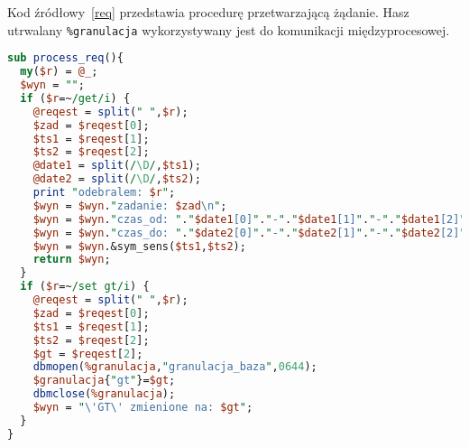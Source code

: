 {\color{dgray}
Kod źródłowy~\ref{req} przedstawia procedurę przetwarzającą żądanie. Hasz utrwalany \verb|%granulacja| wykorzystywany jest do komunikacji międzyprocesowej.
}

\begin{small}
\begin{lstlisting}[language=perl, frame=lines, caption=Przetwarzanie żądania - procedura \texttt{process\_req()}\label{req}., firstnumber=86]
sub process_req(){	
  my($r) = @_;
  $wyn = "";
  if ($r=~/get/i) {
	@reqest = split(" ",$r);
	$zad = $reqest[0];
	$ts1 = $reqest[1];
	$ts2 = $reqest[2];
	@date1 = split(/\D/,$ts1);
	@date2 = split(/\D/,$ts2);
	print "odebralem: $r"; 
	$wyn = $wyn."zadanie: $zad\n";
	$wyn = $wyn."czas_od: "."$date1[0]"."-"."$date1[1]"."-"."$date1[2]"."_"."$date1[3]".":"."$date1[4]".":"."$date1[5]"."\n";
	$wyn = $wyn."czas_do: "."$date2[0]"."-"."$date2[1]"."-"."$date2[2]"."_"."$date2[3]".":"."$date2[4]".":"."$date2[5]"."\n";		
	$wyn = $wyn.&sym_sens($ts1,$ts2);
	return $wyn;
  }
  if ($r=~/set gt/i) {
	@reqest = split(" ",$r);
	$zad = $reqest[0];
	$ts1 = $reqest[1];
	$ts2 = $reqest[2];
	$gt = $reqest[2];
	dbmopen(%granulacja,"granulacja_baza",0644);
	$granulacja{"gt"}=$gt;
	dbmclose(%granulacja);
	$wyn = "\'GT\' zmienione na: $gt";
  }		
}	
\end{lstlisting} 
\end{small}

